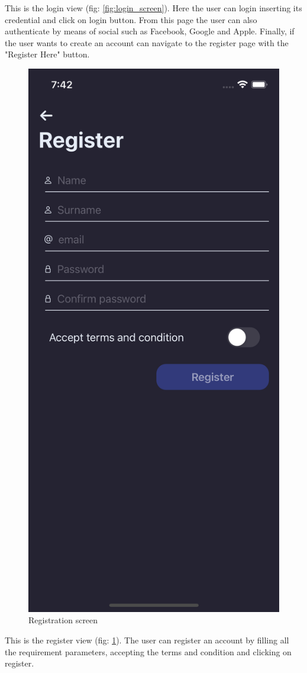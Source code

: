 \FloatBarrier
This is the login view (fig: \ref{fig:login_screen}). Here the user can login inserting its credential and click on login button. From this page the user can also authenticate by means of social such as Facebook, Google and Apple. Finally, if the user wants to create an account can navigate to the register page with the "Register Here" button.

\begin{figure}[h!]
        \centering
        \includegraphics[scale=0.15]{images/interfaces/register_screen.png}
         \caption{Registration screen}
        \label{fig:register_screen}
\end{figure}
\FloatBarrier
This is the register view (fig: \ref{fig:register_screen}). The user can register an account by filling all the requirement parameters, accepting the terms and condition and clicking on register.


